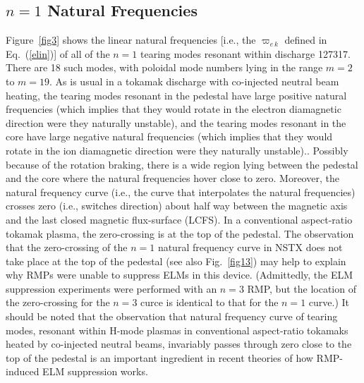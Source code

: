 \documentclass[12pt,prb,aps]{revtex4-1}
\begin{document}
\subsection{$n=1$ Natural Frequencies}
Figure~\ref{fig3} shows the linear natural frequencies [i.e., the $\varpi_{e\,k}$ defined in Eq.~(\ref{elin})] of all of the
$n=1$ tearing modes resonant within discharge 127317. There are 18 such modes, with poloidal mode numbers
lying in the range $m=2$ to $m=19$. As is usual in a tokamak discharge with co-injected neutral beam heating, the tearing modes resonant in the pedestal have large positive natural frequencies (which implies  that they would rotate in
the electron diamagnetic direction were they naturally unstable), and the tearing modes resonant in the core have large negative natural frequencies (which implies  that they would rotate in
the ion diamagnetic direction  were they naturally unstable).\cite{rftor3}. Possibly because of the rotation braking, there is a wide region lying between the pedestal and the core where the natural frequencies hover close to zero. Moreover,
the natural frequency curve (i.e., the curve that interpolates the natural frequencies) crosses zero (i.e., switches direction) about half way between the magnetic axis and the last closed magnetic
flux-surface (LCFS). In a conventional aspect-ratio tokamak plasma, the zero-crossing is at the top of the pedestal.\cite{rftor} The observation that 
the zero-crossing of the $n=1$ natural frequency curve  in NSTX does not take place at the top of the
pedestal (see also Fig.~\ref{fig13}) may help to explain why RMPs were unable to suppress ELMs in this device.\cite{nstx} (Admittedly, the
ELM suppression experiments were performed with an $n=3$ RMP, but the location of the zero-crossing for the
$n=3$ curce is identical to that for the $n=1$ curve.) It should be noted that the observation that  natural frequency curve 
of tearing modes, resonant within H-mode plasmas in conventional aspect-ratio tokamaks heated by co-injected neutral beams, invariably passes through zero close to the 
top of the pedestal is an important ingredient in recent theories of how RMP-induced ELM suppression works.
\cite{rftor,rftor1,rftor2,rftor3, hu}
\end{document}
